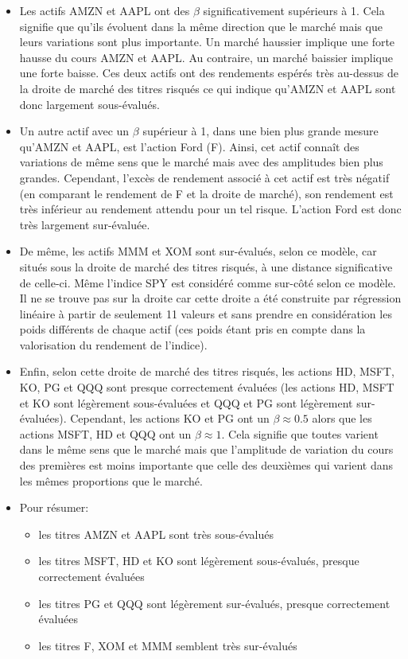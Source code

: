 \documentclass[
]{article}
\providecommand{\tightlist}{%
  \setlength{\itemsep}{0pt}\setlength{\parskip}{0pt}}
\begin{document}
\begin{itemize}
\item
  Les actifs AMZN et AAPL ont des \(\beta\) significativement supérieurs
  à 1. Cela signifie que qu'ils évoluent dans la même direction que le
  marché mais que leurs variations sont plus importante. Un marché
  haussier implique une forte hausse du cours AMZN et AAPL. Au
  contraire, un marché baissier implique une forte baisse. Ces deux
  actifs ont des rendements espérés très au-dessus de la droite de
  marché des titres risqués ce qui indique qu'AMZN et AAPL sont donc
  largement sous-évalués.
\item
  Un autre actif avec un \(\beta\) supérieur à 1, dans une bien plus
  grande mesure qu'AMZN et AAPL, est l'action Ford (F). Ainsi, cet actif
  connaît des variations de même sens que le marché mais avec des
  amplitudes bien plus grandes. Cependant, l'excès de rendement associé
  à cet actif est très négatif (en comparant le rendement de F et la
  droite de marché), son rendement est très inférieur au rendement
  attendu pour un tel risque. L'action Ford est donc très largement
  sur-évaluée.
\item
  De même, les actifs MMM et XOM sont sur-évalués, selon ce modèle, car
  situés sous la droite de marché des titres risqués, à une distance
  significative de celle-ci. Même l'indice SPY est considéré comme
  sur-côté selon ce modèle. Il ne se trouve pas sur la droite car cette
  droite a été construite par régression linéaire à partir de seulement
  11 valeurs et sans prendre en considération les poids différents de
  chaque actif (ces poids étant pris en compte dans la valorisation du
  rendement de l'indice).
\item
  Enfin, selon cette droite de marché des titres risqués, les actions
  HD, MSFT, KO, PG et QQQ sont presque correctement évaluées (les
  actions HD, MSFT et KO sont légèrement sous-évaluées et QQQ et PG sont
  légèrement sur-évaluées). Cependant, les actions KO et PG ont un
  \(\beta \approx 0.5\) alors que les actions MSFT, HD et QQQ ont un
  \(\beta \approx 1\). Cela signifie que toutes varient dans le même
  sens que le marché mais que l'amplitude de variation du cours des
  premières est moins importante que celle des deuxièmes qui varient
  dans les mêmes proportions que le marché.
\item
  Pour résumer:

  \begin{itemize}
  \tightlist
  \item
    les titres AMZN et AAPL sont très sous-évalués
  \item
    les titres MSFT, HD et KO sont légèrement sous-évalués, presque
    correctement évaluées
  \item
    les titres PG et QQQ sont légèrement sur-évalués, presque
    correctement évaluées
  \item
    les titres F, XOM et MMM semblent très sur-évalués
  \end{itemize}
\end{itemize}
\end{document}
